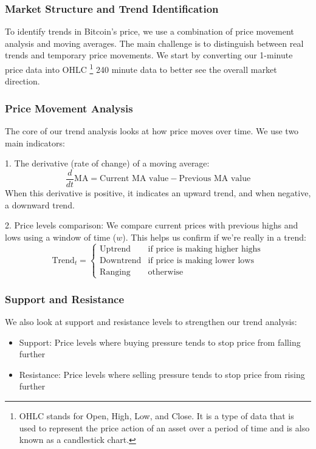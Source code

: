 \documentclass[12pt]{article}
\begin{document}
\subsubsection*{Market Structure and Trend Identification}

To identify trends in Bitcoin's price, we use a combination of price movement analysis and moving averages. The main challenge is to distinguish between real trends and temporary price movements. We start by converting our 1-minute price data into OHLC \footnote{OHLC stands for Open, High, Low, and Close. It is a type of data that is used to represent the price action of an asset over a period of time and is also known as a candlestick chart.} 240 minute data to better see the overall market direction.

\subsubsection*{Price Movement Analysis}
The core of our trend analysis looks at how price moves over time. We use two main indicators:

1. The derivative (rate of change) of a moving average:
\begin{equation*}
    \frac{d}{dt}\text{MA} = \text{Current MA value} - \text{Previous MA value}
\end{equation*}
When this derivative is positive, it indicates an upward trend, and when negative, a downward trend.

2. Price levels comparison:
We compare current prices with previous highs and lows using a window of time ($w$). This helps us confirm if we're really in a trend:
\begin{equation*}
\text{Trend}_t = \begin{cases}
    \text{Uptrend} & \text{if price is making higher highs} \\
    \text{Downtrend} & \text{if price is making lower lows} \\
    \text{Ranging} & \text{otherwise}
\end{cases}
\end{equation*}

\subsubsection*{Support and Resistance}
We also look at support and resistance levels to strengthen our trend analysis:

\begin{itemize}
    \item Support: Price levels where buying pressure tends to stop price from falling further
    \item Resistance: Price levels where selling pressure tends to stop price from rising further
\end{itemize}
\end{document}
